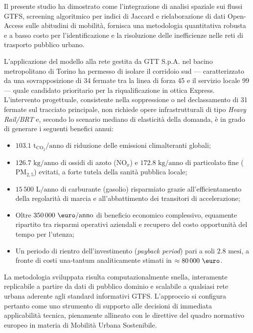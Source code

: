 \documentclass[conference]{IEEEtran}
\begin{document}
Il presente studio ha dimostrato come l'integrazione di analisi spaziale sui flussi GTFS, screening algoritmico per indici di Jaccard e rielaborazione di dati Open-Access sulle abitudini di mobilità, fornisca una metodologia quantitativa robusta e a basso costo per l'identificazione e la risoluzione delle inefficienze nelle reti di trasporto pubblico urbano.

L'applicazione del modello alla rete gestita da GTT S.p.A. nel bacino metropolitano di Torino ha permesso di isolare il corridoio sud --- caratterizzato da una sovrapposizione di 34 fermate tra la linea di forza 45 e il servizio locale 99 --- quale candidato prioritario per la riqualificazione in ottica Express. L'intervento progettuale, consistente nella soppressione o nel declassamento di 31 fermate sul tracciato principale, non richiede opere infrastrutturali di tipo \textit{Heavy Rail/BRT} e, secondo lo scenario mediano di elasticità della domanda, è in grado di generare i seguenti benefici annui:

\begin{itemize}
  \item $103.1 \text{ t}_{\text{CO}_2}\text{/anno}$ di riduzione delle emissioni climalteranti globali;
  \item $126.7 \text{ kg/anno}$ di ossidi di azoto ($\text{NO}_x$) e $172.8 \text{ kg/anno}$ di particolato fine ($\text{PM}_{2{,}5}$) evitati, a forte tutela della sanità pubblica locale;
  \item $15\,500 \text{ L/anno}$ di carburante (gasolio) risparmiato grazie all'efficientamento della regolarità di marcia e all'abbattimento dei transitori di accelerazione;
  \item Oltre $350\,000 \text{ \euro/anno}$ di beneficio economico complessivo, equamente ripartito tra risparmi operativi aziendali e recupero del costo opportunità del tempo per l'utenza;
  \item Un periodo di rientro dell'investimento (\textit{payback period}) pari a soli $2.8 \text{ mesi}$, a fronte di costi una-tantum analiticamente stimati in $\approx 80\,000 \text{ \euro}$.
\end{itemize}

La metodologia sviluppata risulta computazionalmente snella, interamente replicabile a partire da dati di pubblico dominio e scalabile a qualsiasi rete urbana aderente agli standard informativi GTFS. L'approccio si configura pertanto come uno strumento di supporto alle decisioni di immediata applicabilità tecnica, pienamente allineato con le direttive del quadro normativo europeo in materia di Mobilità Urbana Sostenibile.
\end{document}
